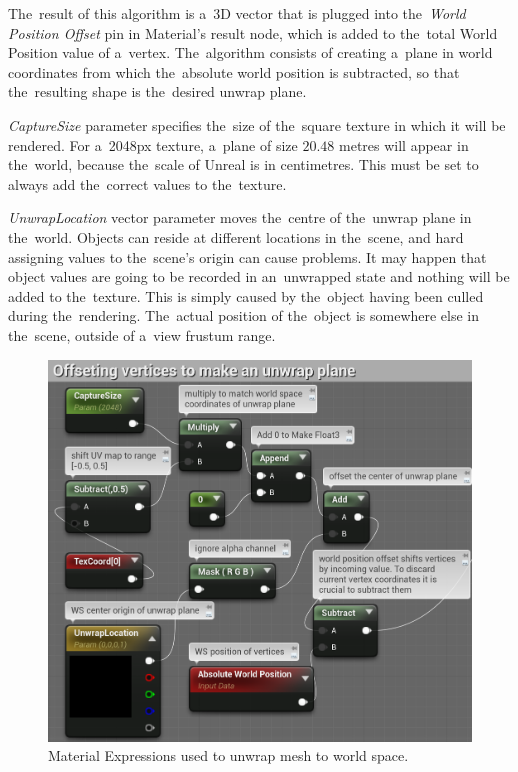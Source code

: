 \pagebreak{}
The~result of this algorithm is a~3D vector that is plugged into the~\emph{World Position Offset} pin in Material's result node, which is added to the~total World Position value of a~vertex. The~algorithm consists of creating a~plane in world coordinates from which the~absolute world position is subtracted, so that the~resulting shape is the~desired unwrap plane.

\emph{CaptureSize} parameter specifies the~size of the~square texture in which it will be rendered. For a~2048px texture, a~plane of size $20.48$ metres will appear in the~world, because the~scale of Unreal is in centimetres. This must be set to always add the~correct values to the~texture. 

\emph{UnwrapLocation} vector parameter moves the~centre of the~unwrap plane in the~world. Objects can reside at different locations in the~scene, and hard assigning values to the~scene's origin can cause problems. It may happen that object values are going to be recorded in an~unwrapped state and nothing will be added to the~texture. This is simply caused by the~object having been culled during the~rendering. The~actual position of the~object is somewhere else in the~scene, outside of a~view frustum range.

\begin{figure}[!t]\centering
    \includegraphics[width=\textwidth]{img/unwrap-method-nodes.png}
    \caption[Material Expressions used to unwrap mesh to world space.]{Material Expressions used to unwrap mesh to world space.~\cite{brucks2016shaderbits}}
    \label{fig:unwrap-offset}
\end{figure}

